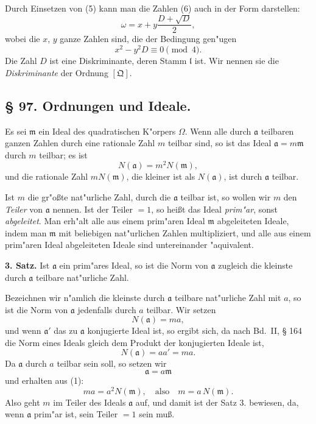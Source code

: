 \documentclass[12pt,a4paper]{article}
\theoremstyle{plain}
\begin{document}
Durch Einsetzen von (5) kann man die Zahlen (6) auch in der Form darstellen:
\begin{equation}
\omega = x + y\frac{D + \sqrt{D}}{2},
\tag{8}
\end{equation}
wobei die $x$, $y$ ganze Zahlen sind, die der Bedingung gen"ugen
\begin{equation}
x^2 - y^2 D \equiv 0 \pmod{4}.
\tag{9}
\end{equation}
Die Zahl $D$ ist eine Diskriminante, deren Stamm $\mathfrak{l}$ ist. Wir nennen sie die \textit{Diskriminante} der Ordnung $[\mathfrak{Q}]$.

\subsection*{\S{} 97. Ordnungen und Ideale.}

Es sei $\mathfrak{m}$ ein Ideal des quadratischen K"orpers $\Omega$. Wenn alle durch $\mathfrak{a}$ teilbaren ganzen Zahlen durch eine rationale Zahl $m$ teilbar sind, so ist das Ideal $\mathfrak{a} = m\mathfrak{m}$ durch $m$ teilbar; es ist
\[
N(\mathfrak{a}) = m^2 N(\mathfrak{m}),
\]
und die rationale Zahl $m N(\mathfrak{m})$, die kleiner ist als $N(\mathfrak{a})$, ist durch $\mathfrak{a}$ teilbar.

Ist $m$ die gr"o\ss te nat"urliche Zahl, durch die $\mathfrak{a}$ teilbar ist, so wollen wir $m$ den \textit{Teiler} von $\mathfrak{a}$ nennen. Ist der Teiler $= 1$, so hei\ss t das Ideal \textit{prim"ar}, sonst \textit{abgeleitet}. Man erh"alt alle aus einem prim"aren Ideal $\mathfrak{m}$ abgeleiteten Ideale, indem man $\mathfrak{m}$ mit beliebigen nat"urlichen Zahlen multipliziert, und alle aus einem prim"aren Ideal abgeleiteten Ideale sind untereinander "aquivalent.

\textbf{3. Satz.} Ist $\mathfrak{a}$ ein prim"ares Ideal, so ist die Norm von $\mathfrak{a}$ zugleich die kleinste durch $\mathfrak{a}$ teilbare nat"urliche Zahl.

Bezeichnen wir n"amlich die kleinste durch $\mathfrak{a}$ teilbare nat"urliche Zahl mit $a$, so ist die Norm von $\mathfrak{a}$ jedenfalls durch $a$ teilbar. Wir setzen
\[
N(\mathfrak{a}) = ma,
\]
und wenn $\mathfrak{a}'$ das zu $\mathfrak{a}$ konjugierte Ideal ist, so ergibt sich, da nach Bd.~II, \S{} 164 die Norm eines Ideals gleich dem Produkt der konjugierten Ideale ist,
\begin{equation}
N(\mathfrak{a}) = aa' = ma.
\tag{1}
\end{equation}
Da $\mathfrak{a}$ durch $a$ teilbar sein soll, so setzen wir
\[
\mathfrak{a} = a\mathfrak{m}
\]
und erhalten aus (1):
\begin{equation}
ma = a^2 N(\mathfrak{m}),\quad \text{also}\quad m = a\,N(\mathfrak{m}).
\tag{2}
\end{equation}
Also geht $m$ im Teiler des Ideals $\mathfrak{a}$ auf, und damit ist der Satz 3. bewiesen, da, wenn $\mathfrak{a}$ prim"ar ist, sein Teiler $= 1$ sein mu\ss{}.
\end{document}
